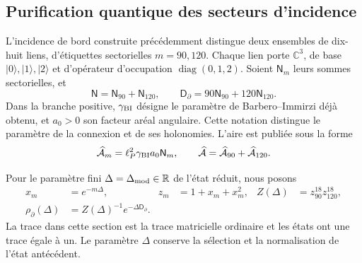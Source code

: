 \subsection{Purification quantique des secteurs d'incidence}
\label{vii:vii:subsec:purificacion-sectorial}

L'incidence de bord construite précédemment distingue deux ensembles
de dix-huit liens, d'étiquettes sectorielles \(m=90,120\). Chaque lien
porte \(\mathbb C^3\), de base \(|0\rangle,|1\rangle,|2\rangle\)
et d'opérateur d'occupation \(\operatorname{diag}(0,1,2)\). Soient
\(\mathsf N_m\) leurs sommes sectorielles, et
\begin{equation}
 \mathsf N=\mathsf N_{90}+\mathsf N_{120},\qquad
 \mathsf D_\partial=90\mathsf N_{90}+120\mathsf N_{120}.
 \label{vii:vii:eq:ocupaciones-sectoriales}
\end{equation}
Dans la branche positive, \(\gamma_{\rm BI}\) désigne le paramètre de
Barbero--Immirzi déjà obtenu, et \(a_0>0\) son facteur aréal angulaire.
Cette notation distingue le paramètre de la connexion et de ses holonomies.
L'aire est publiée sous la forme
\begin{equation}
 \widehat{\mathcal A}_m=\ell_P^2\gamma_{\rm BI}a_0\mathsf N_m,
 \qquad
 \widehat{\mathcal A}=\widehat{\mathcal A}_{90}
                         +\widehat{\mathcal A}_{120}.
 \label{vii:vii:eq:area-sectores}
\end{equation}

Pour le paramètre fini \(\Delta=\Delta_{\rm mod}\in\mathbb R\) de l'état réduit, nous posons
\begin{align}
 x_m&=e^{-m\Delta},& z_m&=1+x_m+x_m^2,&
 Z(\Delta)&=z_{90}^{18}z_{120}^{18},\\
 \rho_\partial(\Delta)&=Z(\Delta)^{-1}e^{-\Delta\mathsf D_\partial}.
 \label{vii:vii:eq:estado-sectorial}
\end{align}
La trace dans cette section est la trace matricielle ordinaire et les états ont une trace égale à un. Le paramètre \(\Delta\) conserve la sélection et la normalisation de l'état antécédent.

